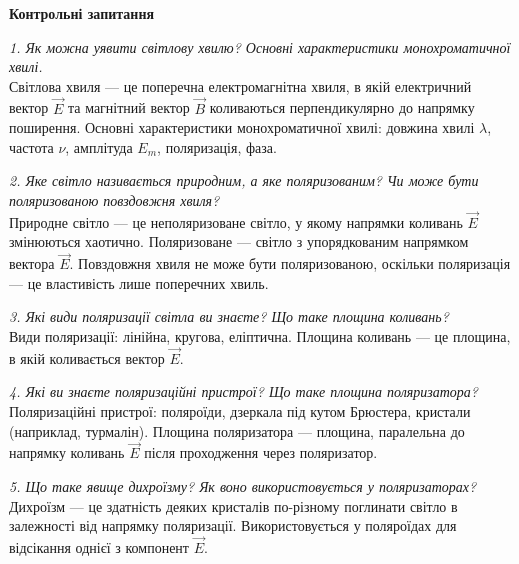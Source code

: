 \documentclass[12pt,a4paper]{article}
\begin{document}
    \newpage

    \begin{center}
        \textbf{\large Контрольні запитання}
    \end{center}

    \textit{1. Як можна уявити світлову хвилю? Основні характеристики монохроматичної хвилі.} \\ 

    Світлова хвиля — це поперечна електромагнітна хвиля, в якій електричний вектор $\vec{E}$ та магнітний вектор $\vec{B}$ коливаються перпендикулярно до напрямку поширення. Основні характеристики монохроматичної хвилі: довжина хвилі $\lambda$, частота $\nu$, амплітуда $E_m$, поляризація, фаза.

    \vspace{1em}

    \textit{2. Яке світло називається природним, а яке поляризованим? Чи може бути поляризованою повздовжня хвиля?} \\ 

    Природне світло — це неполяризоване світло, у якому напрямки коливань $\vec{E}$ змінюються хаотично. Поляризоване — світло з упорядкованим напрямком вектора $\vec{E}$. Повздовжня хвиля не може бути поляризованою, оскільки поляризація — це властивість лише поперечних хвиль.

    \vspace{1em}

    \textit{3. Які види поляризації світла ви знаєте? Що таке площина коливань?} \\ 

    Види поляризації: лінійна, кругова, еліптична. Площина коливань — це площина, в якій коливається вектор $\vec{E}$.

    \vspace{1em}

    \textit{4. Які ви знаєте поляризаційні пристрої? Що таке площина поляризатора?} \\ 

    Поляризаційні пристрої: поляроїди, дзеркала під кутом Брюстера, кристали (наприклад, турмалін). Площина поляризатора — площина, паралельна до напрямку коливань $\vec{E}$ після проходження через поляризатор.

    \vspace{1em}

    \textit{5. Що таке явище дихроїзму? Як воно використовується у поляризаторах?} \\ 

    Дихроїзм — це здатність деяких кристалів по-різному поглинати світло в залежності від напрямку поляризації. Використовується у поляроїдах для відсікання однієї з компонент $\vec{E}$.
\end{document}
